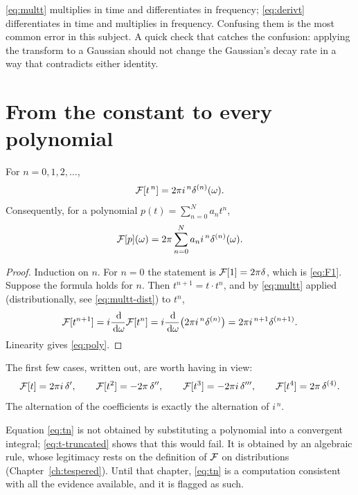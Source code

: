 \begin{remark}
\eqref{eq:multt} multiplies in time and differentiates in frequency; \eqref{eq:derivt}
differentiates in time and multiplies in frequency. Confusing them is the most common error in this
subject. A quick check that catches the confusion: applying the transform to a Gaussian should not
change the Gaussian's decay rate in a way that contradicts either identity.
\end{remark}

\section{From the constant to every polynomial}

\begin{theorem}\label{thm:tn}
For $n=0,1,2,\dots$,
\begin{equation}
\mathcal{F}[t^{\,n}]=2\pi i^{\,n}\delta^{(n)}(\omega).
\label{eq:tn}
\end{equation}
Consequently, for a polynomial $p(t)=\sum_{n=0}^{N}a_{n}t^{n}$,
\begin{equation}
\mathcal{F}[p](\omega)=2\pi\sum_{n=0}^{N}a_{n}i^{\,n}\delta^{(n)}(\omega).
\label{eq:poly}
\end{equation}
\end{theorem}

\begin{proof}
Induction on $n$. For $n=0$ the statement is $\mathcal{F}[1]=2\pi\delta$, which is \eqref{eq:F1}. Suppose
the formula holds for $n$. Then $t^{n+1}=t\cdot t^{n}$, and by \eqref{eq:multt} applied
(distributionally, see \eqref{eq:multt-dist}) to $t^{n}$,
\begin{equation}
\mathcal{F}[t^{n+1}]=i\frac{\,\mathrm{d}}{\,\mathrm{d}\omega}\mathcal{F}[t^{n}]
=i\frac{\,\mathrm{d}}{\,\mathrm{d}\omega}\big(2\pi i^{\,n}\delta^{(n)}\big)
=2\pi i^{\,n+1}\delta^{(n+1)} .
\end{equation}
Linearity gives \eqref{eq:poly}.
\end{proof}

The first few cases, written out, are worth having in view:
\begin{equation}
\mathcal{F}[t]=2\pi i\,\delta',\qquad
\mathcal{F}[t^{2}]=-2\pi\,\delta'',\qquad
\mathcal{F}[t^{3}]=-2\pi i\,\delta''',\qquad
\mathcal{F}[t^{4}]=2\pi\,\delta^{(4)} .
\end{equation}
The alternation of the coefficients is exactly the alternation of $i^{\,n}$.

\begin{remark}
Equation \eqref{eq:tn} is not obtained by substituting a polynomial into a convergent integral;
\eqref{eq:t-truncated} shows that this would fail. It is obtained by an algebraic rule, whose
legitimacy rests on the definition of $\mathcal{F}$ on distributions (Chapter~\ref{ch:tespered}). Until that
chapter, \eqref{eq:tn} is a computation consistent with all the evidence available, and it is flagged
as such.
\end{remark}

